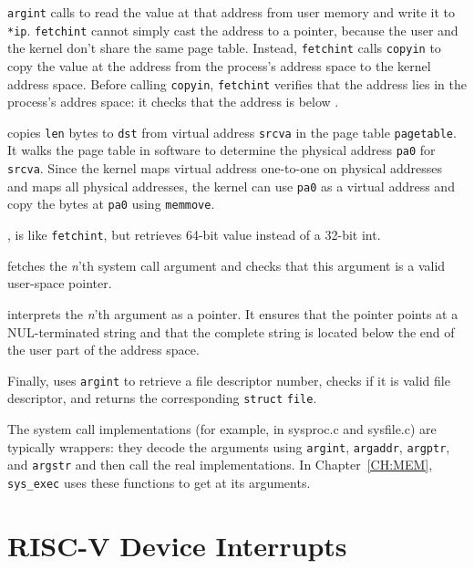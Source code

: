 \lstinline{argint} calls  to read the value at
that address from user memory and write it to \lstinline{*ip}.
\lstinline{fetchint} cannot simply cast the address to a pointer,
because the user and the kernel don't share the same page
table. Instead, \lstinline{fetchint} calls \lstinline{copyin} to copy
the value at the address from the process's address space to the
kernel address space.  Before calling \lstinline{copyin},
\lstinline{fetchint} verifies that the address lies in the process's
addres space: it checks that the address is below .

 copies \lstinline{len} bytes to
\lstinline{dst} from virtual address \lstinline{srcva} in the page
table \lstinline{pagetable}.  It walks the page table in software to
determine the physical address \lstinline{pa0} for \lstinline{srcva}.
Since the kernel maps virtual address one-to-one on physical
addresses and maps all physical addresses, the kernel can use
\lstinline{pa0} as a virtual address and copy the bytes at
\lstinline{pa0} using \lstinline{memmove}.

,
is like
\lstinline{fetchint},
but retrieves 64-bit value instead of a 32-bit int.

fetches the
\textit{n}'th 
system call argument and checks that this argument is a valid
user-space pointer.

interprets the
\textit{n}'th 
argument as a pointer.  It ensures that the pointer points at a
NUL-terminated string and that the complete string is located below
the end of the user part of the address space.

Finally,
uses
\lstinline{argint}
to retrieve a file descriptor number, checks if it is valid
file descriptor, and returns the corresponding
\lstinline{struct}
\lstinline{file}.

The system call implementations (for example, in sysproc.c and sysfile.c)
are typically wrappers: they decode the arguments using 
\lstinline{argint},
\lstinline{argaddr},
\lstinline{argptr}, 
and 
\lstinline{argstr}
and then call the real implementations.
In Chapter~\ref{CH:MEM},
\lstinline{sys_exec}
uses these functions to get at its arguments.

\section{RISC-V Device Interrupts}

